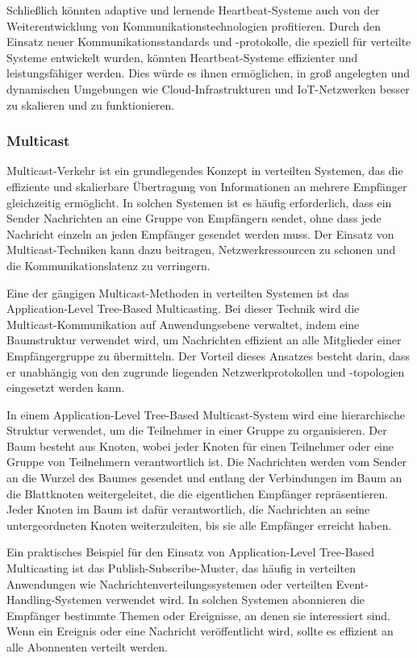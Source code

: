 Schließlich könnten adaptive und lernende Heartbeat-Systeme auch von der Weiterentwicklung von Kommunikationstechnologien profitieren. Durch den Einsatz neuer Kommunikationsstandards und -protokolle, die speziell für verteilte Systeme entwickelt wurden, könnten Heartbeat-Systeme effizienter und leistungsfähiger werden. Dies würde es ihnen ermöglichen, in groß angelegten und dynamischen Umgebungen wie Cloud-Infrastrukturen und IoT-Netzwerken besser zu skalieren und zu funktionieren.

\subsubsection{Multicast}

Multicast-Verkehr ist ein grundlegendes Konzept in verteilten Systemen, das die effiziente und skalierbare Übertragung von Informationen an mehrere Empfänger gleichzeitig ermöglicht. In solchen Systemen ist es häufig erforderlich, dass ein Sender Nachrichten an eine Gruppe von Empfängern sendet, ohne dass jede Nachricht einzeln an jeden Empfänger gesendet werden muss. Der Einsatz von Multicast-Techniken kann dazu beitragen, Netzwerkressourcen zu schonen und die Kommunikationslatenz zu verringern.

Eine der gängigen Multicast-Methoden in verteilten Systemen ist das Application-Level Tree-Based Multicasting. Bei dieser Technik wird die Multicast-Kommunikation auf Anwendungsebene verwaltet, indem eine Baumstruktur verwendet wird, um Nachrichten effizient an alle Mitglieder einer Empfängergruppe zu übermitteln. Der Vorteil dieses Ansatzes besteht darin, dass er unabhängig von den zugrunde liegenden Netzwerkprotokollen und -topologien eingesetzt werden kann.

In einem Application-Level Tree-Based Multicast-System wird eine hierarchische Struktur verwendet, um die Teilnehmer in einer Gruppe zu organisieren. Der Baum besteht aus Knoten, wobei jeder Knoten für einen Teilnehmer oder eine Gruppe von Teilnehmern verantwortlich ist. Die Nachrichten werden vom Sender an die Wurzel des Baumes gesendet und entlang der Verbindungen im Baum an die Blattknoten weitergeleitet, die die eigentlichen Empfänger repräsentieren. Jeder Knoten im Baum ist dafür verantwortlich, die Nachrichten an seine untergeordneten Knoten weiterzuleiten, bis sie alle Empfänger erreicht haben.

Ein praktisches Beispiel für den Einsatz von Application-Level Tree-Based Multicasting ist das Publish-Subscribe-Muster, das häufig in verteilten Anwendungen wie Nachrichtenverteilungssystemen oder verteilten Event-Handling-Systemen verwendet wird. In solchen Systemen abonnieren die Empfänger bestimmte Themen oder Ereignisse, an denen sie interessiert sind. Wenn ein Ereignis oder eine Nachricht veröffentlicht wird, sollte es effizient an alle Abonnenten verteilt werden.

